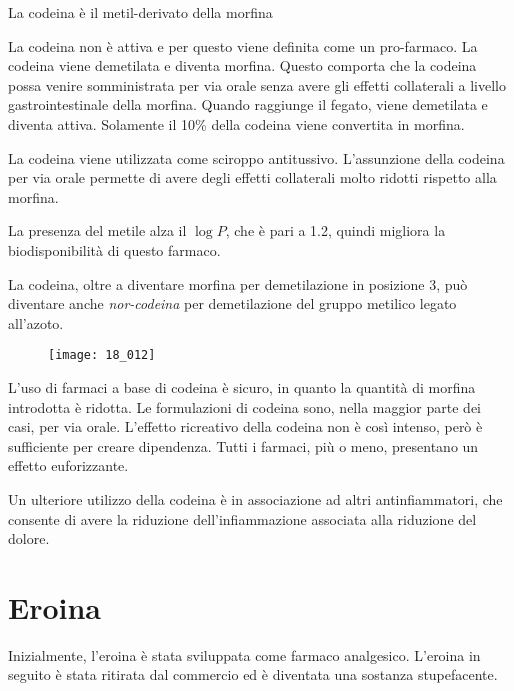 La codeina è il metil-derivato della morfina


La codeina non è attiva e per questo viene definita come un pro-farmaco.
La codeina viene demetilata e diventa morfina. Questo comporta che la
codeina possa venire somministrata per via orale senza avere gli effetti
collaterali a livello gastrointestinale della morfina. Quando raggiunge
il fegato, viene demetilata e diventa attiva. Solamente il 10\% della
codeina viene convertita in morfina.

La codeina viene utilizzata come sciroppo
antitussivo.
L'assunzione della codeina per via orale permette di avere degli effetti
collaterali molto ridotti rispetto alla morfina.

La presenza del metile alza il \(\log{} P\), che è pari a 1.2, quindi
migliora la
biodisponibilità
di questo farmaco.

La codeina, oltre a diventare morfina per demetilazione in posizione 3,
può diventare anche \emph{nor-codeina} per demetilazione del gruppo
metilico legato all'azoto.
\begin{figure}[H]
  \centering
  \texttt{[image: 18\_012]}
\end{figure}

L'uso di farmaci a base di codeina è sicuro, in quanto la quantità di
morfina introdotta è ridotta. Le formulazioni di codeina sono, nella
maggior parte dei casi, per via orale. L'effetto
ricreativo della codeina non è così
intenso, però è sufficiente per creare dipendenza. Tutti i farmaci, più
o meno, presentano un effetto euforizzante.

Un ulteriore utilizzo della codeina è in associazione ad altri
antinfiammatori, che consente di avere la riduzione dell'infiammazione
associata alla riduzione del dolore.

\clearpage

\section{Eroina}

Inizialmente, l'eroina è stata sviluppata come farmaco analgesico.
L'eroina in seguito è stata ritirata dal commercio ed è diventata una
sostanza stupefacente.

